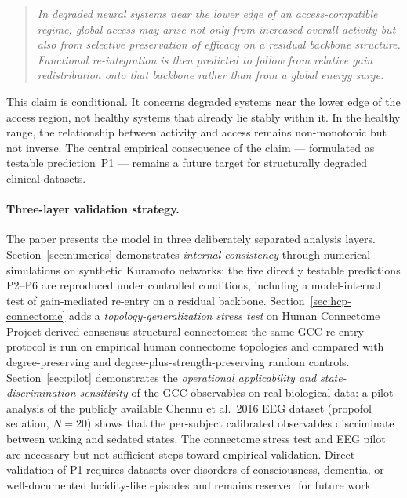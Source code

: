 \documentclass[11pt,a4paper]{article}
\theoremstyle{plain}
\theoremstyle{definition}
\theoremstyle{remark}
\begin{document}
\begin{quote}
\itshape
In degraded neural systems near the lower edge of an access-compatible regime, global access may arise not only from increased overall activity but also from selective preservation of efficacy on a residual backbone structure. Functional re-integration is then predicted to follow from relative gain redistribution onto that backbone rather than from a global energy surge.
\end{quote}

This claim is conditional. It concerns degraded systems near the lower edge of the access region, not healthy systems that already lie stably within it. In the healthy range, the relationship between activity and access remains non-monotonic but not inverse. The central empirical consequence of the claim --- formulated as testable prediction~P1 --- remains a future target for structurally degraded clinical datasets.

\paragraph{Three-layer validation strategy.}
The paper presents the model in three deliberately separated analysis layers. Section~\ref{sec:numerics} demonstrates \emph{internal consistency} through numerical simulations on synthetic Kuramoto networks: the five directly testable predictions P2--P6 are reproduced under controlled conditions, including a model-internal test of gain-mediated re-entry on a residual backbone. Section~\ref{sec:hcp-connectome} adds a \emph{topology-generalization stress test} on Human Connectome Project-derived consensus structural connectomes: the same GCC re-entry protocol is run on empirical human connectome topologies and compared with degree-preserving and degree-plus-strength-preserving random controls. Section~\ref{sec:pilot} demonstrates the \emph{operational applicability and state-discrimination sensitivity} of the GCC observables on real biological data: a pilot analysis of the publicly available Chennu et al.\ 2016 EEG dataset (propofol sedation, $N = 20$) shows that the per-subject calibrated observables discriminate between waking and sedated states. The connectome stress test and EEG pilot are necessary but not sufficient steps toward empirical validation. Direct validation of P1 requires datasets over disorders of consciousness, dementia, or well-documented lucidity-like episodes and remains reserved for future work \citep{laureys2004,giacino2014}.
\end{document}
